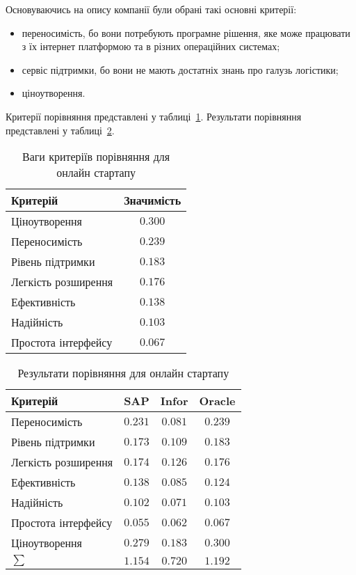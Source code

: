 Основуваючись на опису компанії були обрані такі основні критерії:
\begin{itemize}
	\item переносимість, бо вони потребують програмне рішення, яке може працювати з їх інтернет платформою та в різних операційних системах;
	\item сервіс підтримки, бо вони не мають достатніх знань про галузь логістики;
	\item ціноутворення.
\end{itemize}

Критерії порівняння представлені у таблиці~\ref{tab:criterias_startup}. Результати порівняння представлені у таблиці~\ref{tab:results_startup}.

\begin{table}[H]
	\caption{Ваги критеріїв порівняння для онлайн стартапу}
	\label{tab:criterias_startup}
	\begin{tabular}{l|c}
		Критерій & Значимість \\\hline
		Ціноутворення & $0.300$ \\
		Переносимість & $0.239$ \\
		Рівень підтримки & $0.183$ \\
		Легкість розширення & $0.176$ \\
		Ефективність & $0.138$ \\
		Надійність & $0.103$ \\
		Простота інтерфейсу & $0.067$ \\
	\end{tabular}
\end{table}

\begin{table}[H]
	\caption{Результати порівняння для онлайн стартапу}
	\label{tab:results_startup}
	\begin{tabular}{l|c|c|c}
		Критерій & SAP & Infor & Oracle \\\hline
		Переносимість & $0.231$ & $0.081$ & $0.239$ \\
		Рівень підтримки & $0.173$ & $0.109$ & $0.183$ \\
		Легкість розширення & $0.174$ & $0.126$ & $0.176$ \\
		Ефективність & $0.138$ & $0.085$ & $0.124$ \\
		Надійність & $0.102$ & $0.071$ & $0.103$ \\
		Простота інтерфейсу & $0.055$ & $0.062$ & $0.067$ \\
		Ціноутворення & $0.279$ & $0.183$ & $0.300$ \\\hline
		$\sum$ & $1.154$ & $0.720$ & $1.192$ \\
	\end{tabular}
\end{table}

